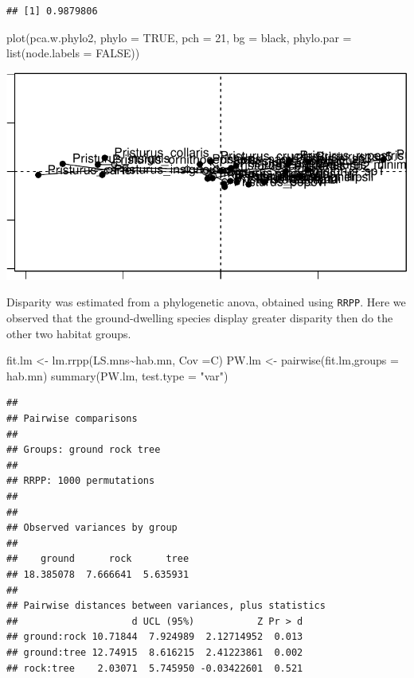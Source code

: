 \documentclass[
  11pt,
]{article}
\newenvironment{Shaded}{\begin{snugshade}}{\end{snugshade}}
\newcommand{\AttributeTok}[1]{\textcolor[rgb]{0.77,0.63,0.00}{#1}}
\newcommand{\ConstantTok}[1]{\textcolor[rgb]{0.00,0.00,0.00}{#1}}
\newcommand{\DecValTok}[1]{\textcolor[rgb]{0.00,0.00,0.81}{#1}}
\newcommand{\FunctionTok}[1]{\textcolor[rgb]{0.00,0.00,0.00}{#1}}
\newcommand{\NormalTok}[1]{#1}
\newcommand{\OtherTok}[1]{\textcolor[rgb]{0.56,0.35,0.01}{#1}}
\newcommand{\SpecialCharTok}[1]{\textcolor[rgb]{0.00,0.00,0.00}{#1}}
\newcommand{\StringTok}[1]{\textcolor[rgb]{0.31,0.60,0.02}{#1}}
\begin{document}
\begin{verbatim}
## [1] 0.9879806
\end{verbatim}

\begin{Shaded}
\begin{Highlighting}[]
\FunctionTok{plot}\NormalTok{(pca.w.phylo2, }\AttributeTok{phylo =} \ConstantTok{TRUE}\NormalTok{, }\AttributeTok{pch =} \DecValTok{21}\NormalTok{, }\AttributeTok{bg =} \StringTok{\textquotesingle{}black\textquotesingle{}}\NormalTok{, }
     \AttributeTok{phylo.par =} \FunctionTok{list}\NormalTok{(}\AttributeTok{node.labels =} \ConstantTok{FALSE}\NormalTok{))}
\end{Highlighting}
\end{Shaded}

\includegraphics{Pristurus-SuppInfo-2-DCA_files/figure-latex/unnamed-chunk-7-1.pdf}

Disparity was estimated from a phylogenetic anova, obtained using
\texttt{RRPP}. Here we observed that the ground-dwelling species display
greater disparity then do the other two habitat groups.

\begin{Shaded}
\begin{Highlighting}[]
\NormalTok{fit.lm }\OtherTok{\textless{}{-}} \FunctionTok{lm.rrpp}\NormalTok{(LS.mns}\SpecialCharTok{\textasciitilde{}}\NormalTok{hab.mn, }\AttributeTok{Cov =}\NormalTok{C)}
\NormalTok{PW.lm }\OtherTok{\textless{}{-}} \FunctionTok{pairwise}\NormalTok{(fit.lm,}\AttributeTok{groups =}\NormalTok{ hab.mn)}
\FunctionTok{summary}\NormalTok{(PW.lm, }\AttributeTok{test.type =} \StringTok{"var"}\NormalTok{)}
\end{Highlighting}
\end{Shaded}

\begin{verbatim}
## 
## Pairwise comparisons
## 
## Groups: ground rock tree 
## 
## RRPP: 1000 permutations
## 
## 
## Observed variances by group
## 
##    ground      rock      tree 
## 18.385078  7.666641  5.635931 
## 
## Pairwise distances between variances, plus statistics
##                    d UCL (95%)           Z Pr > d
## ground:rock 10.71844  7.924989  2.12714952  0.013
## ground:tree 12.74915  8.616215  2.41223861  0.002
## rock:tree    2.03071  5.745950 -0.03422601  0.521
\end{verbatim}
\end{document}
